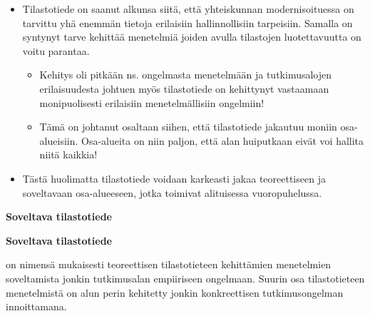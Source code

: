 \documentclass[
]{book}
\providecommand{\tightlist}{%
  \setlength{\itemsep}{0pt}\setlength{\parskip}{0pt}}
\begin{document}
\begin{itemize}
\tightlist
\item
  Tilastotiede on saanut alkunsa siitä, että yhteiskunnan modernisoituessa on tarvittu yhä enemmän tietoja erilaisiin hallinnollisiin tarpeisiin. Samalla on syntynyt tarve kehittää menetelmiä joiden avulla tilastojen luotettavuutta on voitu parantaa.

  \begin{itemize}
  \tightlist
  \item
    Kehitys oli pitkään ns. ongelmasta menetelmään ja tutkimusalojen erilaisuudesta johtuen myös tilastotiede on kehittynyt vastaamaan monipuolisesti erilaisiin menetelmällisiin ongelmiin!
  \item
    Tämä on johtanut osaltaan siihen, että tilastotiede jakautuu moniin osa-alueisiin. Osa-alueita on niin paljon, että alan huiputkaan eivät voi hallita niitä kaikkia!
  \end{itemize}
\item
  Tästä huolimatta tilastotiede voidaan karkeasti jakaa teoreettiseen ja soveltavaan osa-alueeseen, jotka toimivat alituisessa vuoropuhelussa.
\end{itemize}

\textbf{Soveltava tilastotiede}

\begin{defblock}{}
\textbf{Soveltava tilastotiede}

on nimensä mukaisesti teoreettisen tilastotieteen kehittämien menetelmien soveltamista jonkin tutkimusalan empiiriseen ongelmaan. Suurin osa tilastotieteen menetelmistä on alun perin kehitetty jonkin konkreettisen tutkimusongelman innoittamana.

\end{defblock}
\end{document}
